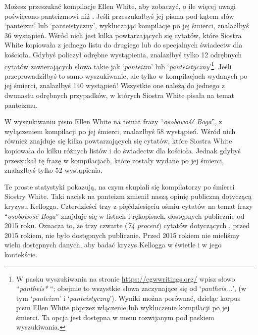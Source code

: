 Możesz przeszukać kompilacje Ellen White, aby zobaczyć, o ile więcej uwagi poświęcono panteizmowi niż . Jeśli przeszukałbyś jej pisma pod kątem słów ‘panteizm’ lub ‘panteistyczny’, wykluczając kompilacje po jej śmierci, znalazłbyś 36 wystąpień. Wśród nich jest kilka powtarzających się cytatów, które Siostra White kopiowała z jednego listu do drugiego lub do specjalnych świadectw dla kościoła. Gdybyś policzył odrębne wystąpienia, znalazłbyś tylko 12 odrębnych cytatów zawierających słowa takie jak ‘\textit{panteizm}’ lub ‘\textit{panteistyczny}’\footnote{W pasku wyszukiwania na stronie \href{https://egwwritings.org/}{https://egwwritings.org/} wpisz słowo “\textit{pantheis*} “; obejmie to wszystkie słowa zaczynające się od ‘\textit{pantheis...}’, (w tym ‘\textit{panteizm}’ i ‘\textit{panteistyczny}’). Wyniki można porównać, dzieląc korpus pism Ellen White poprzez włączenie lub wykluczenie kompilacji po jej śmierci. Ta opcja jest dostępna w menu rozwijanym pod paskiem wyszukiwania.}. Jeśli przeprowadziłbyś to samo wyszukiwanie, ale tylko w kompilacjach wydanych po jej śmierci, znalazłbyś 140 wystąpień! Wszystkie one należą do jednego z dwunastu odrębnych przypadków, w których Siostra White pisała na temat panteizmu.

W wyszukiwaniu pism Ellen White na temat frazy “\textit{osobowość Boga}”, z wyłączeniem kompilacji po jej śmierci, znalazłbyś 58 wystąpień. Wśród nich również znajduje się kilka powtarzających się cytatów, które Siostra White kopiowała do kilku różnych listów i do świadectw dla kościoła. Jednak gdybyś przeszukał tę frazę w kompilacjach, które zostały wydane po jej śmierci, znalazłbyś tylko 52 wystąpienia.

Te proste statystyki pokazują, na czym skupiali się kompilatorzy po śmierci Siostry White. Taki nacisk na panteizm zmienił naszą opinię publiczną dotyczącą kryzysu Kellogga. Czterdzieści trzy z pięćdziesięciu ośmiu cytatów na temat frazy “\textit{osobowość Boga}” znajduje się w listach i rękopisach, dostępnych publicznie od 2015 roku. Oznacza to, że trzy czwarte (\textit{74 procent}) cytatów dotyczących , przed 2015 rokiem, nie było dostępnych publicznie. Przed 2015 rokiem nie mieliśmy wielu dostępnych danych, aby badać kryzys Kellogga w świetle  i w jego kontekście.


%

% 
